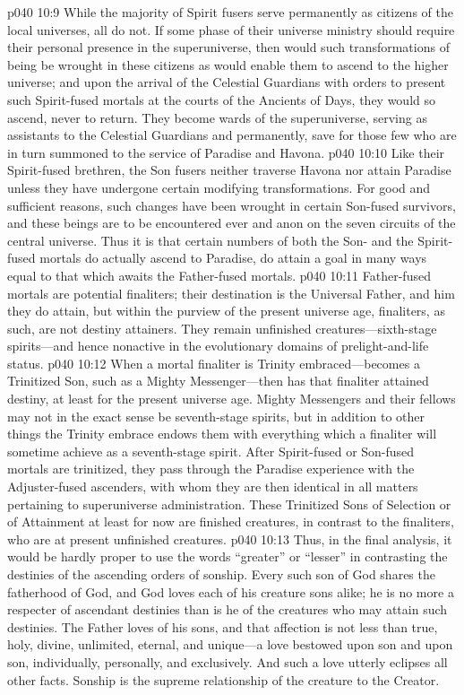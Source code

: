 \pc \vs p040 10:9 While the majority of Spirit fusers serve permanently as citizens of the local universes, all do not. If some phase of their universe ministry should require their personal presence in the superuniverse, then would such transformations of being be wrought in these citizens as would enable them to ascend to the higher universe; and upon the arrival of the Celestial Guardians with orders to present such Spirit\hyp{}fused mortals at the courts of the Ancients of Days, they would so ascend, never to return. They become wards of the superuniverse, serving as assistants to the Celestial Guardians and permanently, save for those few who are in turn summoned to the service of Paradise and Havona.
\vs p040 10:10 Like their Spirit\hyp{}fused brethren, the Son fusers neither traverse Havona nor attain Paradise unless they have undergone certain modifying transformations. For good and sufficient reasons, such changes have been wrought in certain Son\hyp{}fused survivors, and these beings are to be encountered ever and anon on the seven circuits of the central universe. Thus it is that certain numbers of both the Son\hyp{} and the Spirit\hyp{}fused mortals do actually ascend to Paradise, do attain a goal in many ways equal to that which awaits the Father\hyp{}fused mortals.
\vs p040 10:11 Father\hyp{}fused mortals are potential finaliters; their destination is the Universal Father, and him they do attain, but within the purview of the present universe age, finaliters, as such, are not destiny attainers. They remain unfinished creatures---sixth\hyp{}stage spirits---and hence nonactive in the evolutionary domains of prelight\hyp{}and\hyp{}life status.
\vs p040 10:12 When a mortal finaliter is Trinity em\-braced---becomes a Trinitized Son, such as a Mighty Messenger---then has that finaliter attained destiny, at least for the present universe age. Mighty Messengers and their fellows may not in the exact sense be seventh\hyp{}stage spirits, but in addition to other things the Trinity embrace endows them with everything which a finaliter will sometime achieve as a seventh\hyp{}stage spirit. After Spirit\hyp{}fused or Son\hyp{}fused mortals are trinitized, they pass through the Paradise experience with the Adjuster\hyp{}fused ascenders, with whom they are then identical in all matters pertaining to superuniverse administration. These Trinitized Sons of Selection or of Attainment at least for now are finished creatures, in contrast to the finaliters, who are at present unfinished creatures.
\pc \vs p040 10:13 Thus, in the final analysis, it would be hardly proper to use the words “greater” or “lesser” in contrasting the destinies of the ascending orders of sonship. Every such son of God shares the fatherhood of God, and God loves each of his creature sons alike; he is no more a respecter of ascendant destinies than is he of the creatures who may attain such destinies. The Father loves  of his sons, and that affection is not less than true, holy, divine, unlimited, eternal, and unique---a love bestowed upon  son and upon  son, individually, personally, and exclusively. And such a love utterly eclipses all other facts. Sonship is the supreme relationship of the creature to the Creator.
